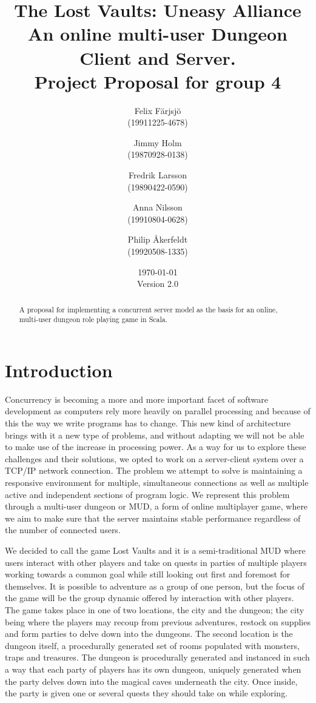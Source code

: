 \documentclass[a4paper]{article}
\title{The Lost Vaults: Uneasy Alliance\\\small{An online multi-user Dungeon Client and Server.}\\\small{Project Proposal for group 4}}
\author{Felix Färjsjö\\(19911225-4678) \and Jimmy Holm\\(19870928-0138) \and Fredrik Larsson\\(19890422-0590) \and Anna Nilsson\\(19910804-0628) \and Philip Åkerfeldt\\(19920508-1335)}
\date{\today\\Version 2.0}
\begin{document}
\maketitle
\newpage
\begin{abstract}
A proposal for implementing a concurrent server model as the basis for an online, multi-user dungeon role playing game in Scala.
\end{abstract}

\tableofcontents
\listoffigures
\newpage
\section{Introduction}
Concurrency is becoming a more and more important facet of software development as computers rely more heavily on parallel processing and because of this the way we write programs has to change. 
This new kind of architecture brings with it a new type of problems, and without adapting we will not be able to make use of the increase in processing power. 
As a way for us to explore these challenges and their solutions, we opted to work on a server-client system over a TCP/IP network connection. The problem we attempt to solve is maintaining a responsive 
environment for multiple, simultaneous connections as well as multiple active and independent sections of program logic. We represent this problem through a multi-user dungeon or 
MUD, a form of online multiplayer game, where we aim to make sure that the server maintains stable performance regardless of the number of connected users.

We decided to call the game Lost Vaults and it is a semi-traditional MUD where users interact with other players and take on quests in parties 
of multiple players working towards a common goal while still looking out first and foremost for themselves. It is possible to adventure as a group of one person, but the focus of the 
game will be the group dynamic offered by interaction with other players. 
The game takes place in one of two locations, the city and the dungeon; the city being where the players may recoup from previous adventures, restock on supplies and 
form parties to delve down into the dungeons. The second location is the dungeon itself, a procedurally generated set of rooms populated with monsters, traps and treasures.
The dungeon is procedurally generated and instanced in such a way that each party of players has its own dungeon, uniquely generated when the party delves down into 
the magical caves underneath the city. Once inside, the party is given one or several quests they should take on while exploring.
\end{document}

